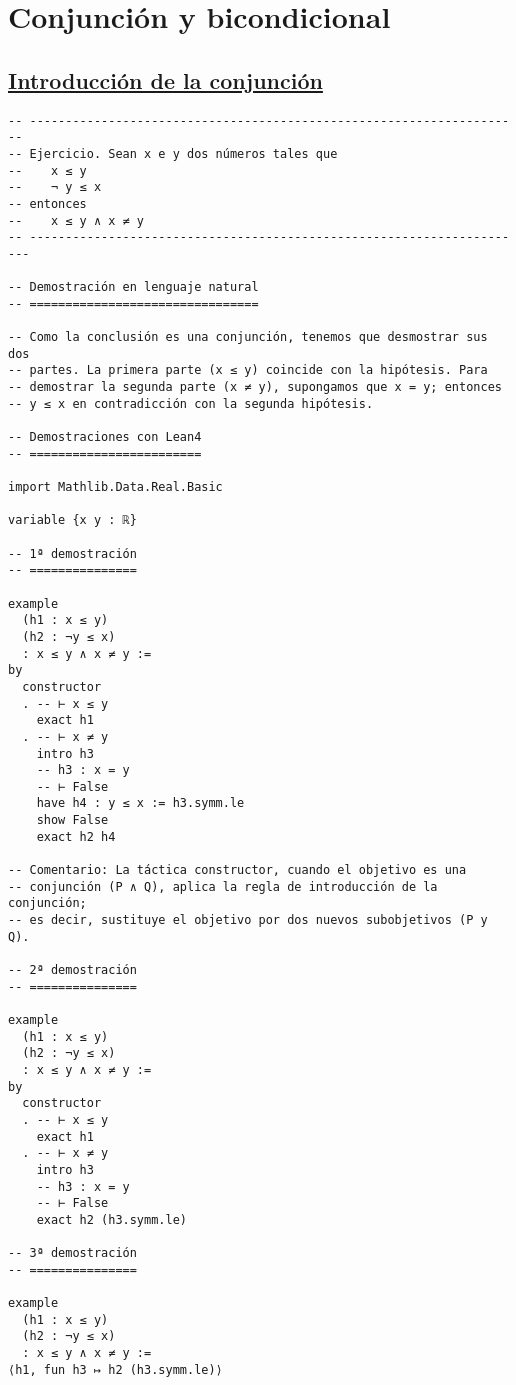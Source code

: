 \section{Conjunción y bicondicional}
\label{sec:org9fb0cff}

\subsection{\href{./src/Logica/Introduccion\_de\_la\_conjuncion.lean}{Introducción de la conjunción}}
\label{sec:org60e6cd7}
\begin{verbatim}
-- ---------------------------------------------------------------------
-- Ejercicio. Sean x e y dos números tales que
--    x ≤ y
--    ¬ y ≤ x
-- entonces
--    x ≤ y ∧ x ≠ y
-- ----------------------------------------------------------------------

-- Demostración en lenguaje natural
-- ================================

-- Como la conclusión es una conjunción, tenemos que desmostrar sus dos
-- partes. La primera parte (x ≤ y) coincide con la hipótesis. Para
-- demostrar la segunda parte (x ≠ y), supongamos que x = y; entonces
-- y ≤ x en contradicción con la segunda hipótesis.

-- Demostraciones con Lean4
-- ========================

import Mathlib.Data.Real.Basic

variable {x y : ℝ}

-- 1ª demostración
-- ===============

example
  (h1 : x ≤ y)
  (h2 : ¬y ≤ x)
  : x ≤ y ∧ x ≠ y :=
by
  constructor
  . -- ⊢ x ≤ y
    exact h1
  . -- ⊢ x ≠ y
    intro h3
    -- h3 : x = y
    -- ⊢ False
    have h4 : y ≤ x := h3.symm.le
    show False
    exact h2 h4

-- Comentario: La táctica constructor, cuando el objetivo es una
-- conjunción (P ∧ Q), aplica la regla de introducción de la conjunción;
-- es decir, sustituye el objetivo por dos nuevos subobjetivos (P y Q).

-- 2ª demostración
-- ===============

example
  (h1 : x ≤ y)
  (h2 : ¬y ≤ x)
  : x ≤ y ∧ x ≠ y :=
by
  constructor
  . -- ⊢ x ≤ y
    exact h1
  . -- ⊢ x ≠ y
    intro h3
    -- h3 : x = y
    -- ⊢ False
    exact h2 (h3.symm.le)

-- 3ª demostración
-- ===============

example
  (h1 : x ≤ y)
  (h2 : ¬y ≤ x)
  : x ≤ y ∧ x ≠ y :=
⟨h1, fun h3 ↦ h2 (h3.symm.le)⟩


\end{verbatim}
